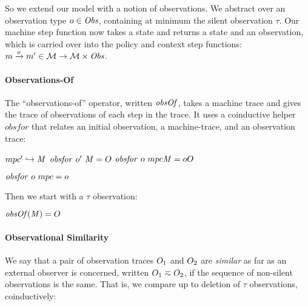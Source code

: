 \documentclass[acmsmall,review,anonymous]{acmart}\settopmatter{printfolios=true,printccs=false,printacmref=false}
\begin{document}
So we extend our model with a notion of observations. We abstract over an
observation type \(\obs \in \OBSS\), containing at minimum the silent observation
\(\tau\). Our machine step function now takes a state and returns a state and an observation,
which is carried over into the policy and context step functions:
%
$\mach \stepsto[\obs] \mach' \in \MACHS \rightarrow \MACHS \times \OBSS $.
%

\paragraph*{Observations-Of}

The ``observations-of'' operator, written \(\obsof\), takes a machine trace and
gives the trace of observations of each step in
the trace. It uses a coinductive helper \(\mathit{obsfor}\) that relates an
initial observation, a machine-trace, and an observation trace:

\begin{minipage}[b]{.6\textwidth}
                {\(\mpcstatename' \hookrightarrow \MPCT\)}
                {\(\mathit{obsfor} ~ \obs' ~ \MPCT = \obsT\)}
                {\(\mathit{obsfor} ~ \obs ~ \mpcstatename \MPCT = \obs\obsT\)}%
\end{minipage}
\begin{minipage}[b]{.35\textwidth}
  \judgment{}
           {\(\mathit{obsfor} ~ \obs ~ \mpcstatename = \obs\)}
\end{minipage}

\begin{minipage}{.35\textwidth}
  Then we start with a \(\tau\) observation:
\end{minipage}
\begin{minipage}{.6\textwidth}
         {\(\obsof(\MPCT) = \obsT\)}
\end{minipage}

\paragraph*{Observational Similarity}

We say that a pair of observation traces $\obsT_1$ and $\obsT_2$ are {\em similar}
as far as an external observer is concerned, written \(\obsT_1 \eqsim
\obsT_2\), if the sequence of non-silent observations is the same. That is, we
compare up to deletion of \(\tau\) observations, coinductively:
\end{document}
